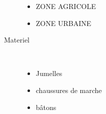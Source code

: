 \documentclass[titlepage]{article}
\begin{document}
\begin{description}
{\begin{itemize}
        \item{ZONE AGRICOLE}
    
        \item{ZONE URBAINE}
    
            \end{itemize}
            }
            
            \item[Materiel]~\\{
        \begin{itemize}
        
        \item{Jumelles}
    
        \item{chaussures de marche}
    
        \item{bâtons}
    
        \end{itemize}
        }
        \end{description}
    
\end{document}
